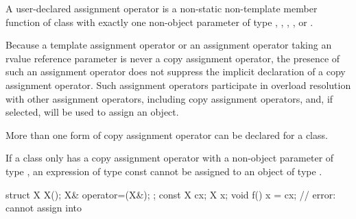 \pnum
{}%
%
%
%
%
%
%
A user-declared  assignment operator  is a
non-static non-template member function of class  with exactly one
non-object parameter of type , , ,
, or .
\begin{footnote}
Because
a template assignment operator or an assignment operator
taking an rvalue reference parameter is never a copy assignment operator,
the presence of such an assignment operator does not suppress the
implicit declaration of a copy assignment operator. Such assignment operators
participate in overload resolution with other assignment operators, including
copy assignment operators, and, if selected, will be used to assign an object.
\end{footnote}
\begin{note}
More than one form of copy assignment operator can be declared for a class.
\end{note}
\begin{note}
If a class
only has a copy assignment operator with a non-object parameter of type
,
an expression of type const
cannot be assigned to an object of type
.
\begin{example}
\begin{codeblock}
struct X {
  X();
  X& operator=(X&);
};
const X cx;
X x;
void f() {
  x = cx;           // error:  cannot assign  into 
}
\end{codeblock}
\end{example}
\end{note}

